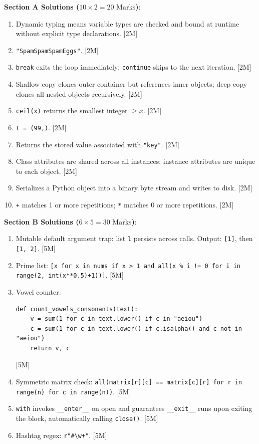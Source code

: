 \begin{solutionbox}
\noindent\textbf{Section A Solutions ($10 \times 2 = 20\text{ Marks}$)}:
\begin{enumerate}
    \item Dynamic typing means variable types are checked and bound at runtime without explicit type declarations. [2M]
    \item \texttt{"SpamSpamSpamEggs"}. [2M]
    \item \texttt{break} exits the loop immediately; \texttt{continue} skips to the next iteration. [2M]
    \item Shallow copy clones outer container but references inner objects; deep copy clones all nested objects recursively. [2M]
    \item \texttt{ceil(x)} returns the smallest integer $\ge x$. [2M]
    \item \texttt{t = (99,)}. [2M]
    \item Returns the stored value associated with \texttt{"key"}. [2M]
    \item Class attributes are shared across all instances; instance attributes are unique to each object. [2M]
    \item Serializes a Python object into a binary byte stream and writes to disk. [2M]
    \item \texttt{+} matches 1 or more repetitions; \texttt{*} matches 0 or more repetitions. [2M]
\end{enumerate}

\medskip
\noindent\textbf{Section B Solutions ($6 \times 5 = 30\text{ Marks}$)}:
\begin{enumerate}[start=11]
    \item Mutable default argument trap: list \texttt{l} persists across calls. Output: \texttt{[1]}, then \texttt{[1, 2]}. [5M]
    \item Prime list: \texttt{[x for x in nums if x > 1 and all(x \% i != 0 for i in range(2, int(x**0.5)+1))]}. [5M]
    \item Vowel counter:
    \begin{lstlisting}[language=Python3]
def count_vowels_consonants(text):
    v = sum(1 for c in text.lower() if c in "aeiou")
    c = sum(1 for c in text.lower() if c.isalpha() and c not in "aeiou")
    return v, c
    \end{lstlisting} [5M]
    \item Symmetric matrix check: \texttt{all(matrix[r][c] == matrix[c][r] for r in range(n) for c in range(n))}. [5M]
    \item \texttt{with} invokes \texttt{\_\_enter\_\_} on open and guarantees \texttt{\_\_exit\_\_} runs upon exiting the block, automatically calling \texttt{close()}. [5M]
    \item Hashtag regex: \texttt{r"\#\textbackslash w+"}. [5M]
\end{enumerate}


\end{solutionbox}
